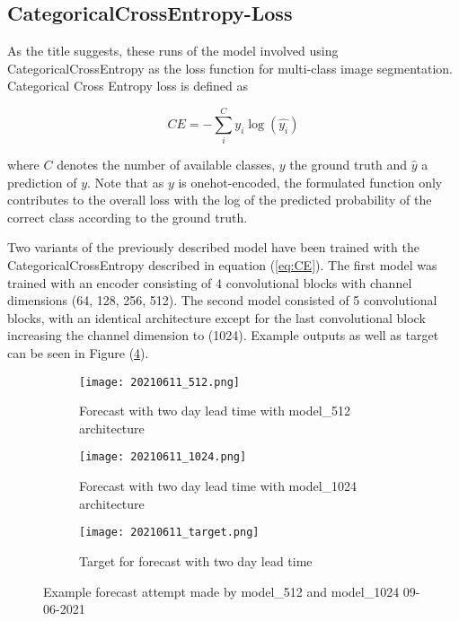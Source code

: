 \subsection{CategoricalCrossEntropy-Loss}
As the title suggests, these runs of the model involved using CategoricalCrossEntropy as the loss function for multi-class image segmentation. Categorical Cross Entropy loss is defined as 

\begin{equation}
    \label{eq:CE}
    CE = - \sum_i^C y_i\log{(\hat{y_i})}
\end{equation}

where $C$ denotes the number of available classes, $y$ the ground truth and $\hat{y}$ a prediction of $y$. Note that as $y$ is onehot-encoded, the formulated function only contributes to the overall loss with the log of the predicted probability of the correct class according to the ground truth.

Two variants of the previously described model have been trained with the CategoricalCrossEntropy described in equation (\ref{eq:CE}). The first model was trained with an encoder consisting of 4 convolutional blocks with channel dimensions (64, 128, 256, 512). The second model consisted of 5 convolutional blocks, with an identical architecture except for the last convolutional block increasing the channel dimension to (1024). Example outputs as well as target can be seen in Figure (\ref{fig:20210611}).

\begin{figure}
    \begin{subfigure}{0.49\textwidth}
        \texttt{[image: 20210611\_512.png]}
        \caption{\label{fig:model51220210611}Forecast with two day lead time with model\_512 architecture}
    \end{subfigure}
    \hfill
    \begin{subfigure}{0.49\textwidth}
        \texttt{[image: 20210611\_1024.png]}
        \caption{\label{fig:model102420210611}Forecast with two day lead time with model\_1024 architecture}
    \end{subfigure}
    \begin{subfigure}{\textwidth}
        \texttt{[image: 20210611\_target.png]}
        \caption{\label{fig:target20210611}Target for forecast with two day lead time}
    \end{subfigure}
       \caption{\label{fig:20210611}Example forecast attempt made by model\_512 and model\_1024 09-06-2021}
\end{figure}

